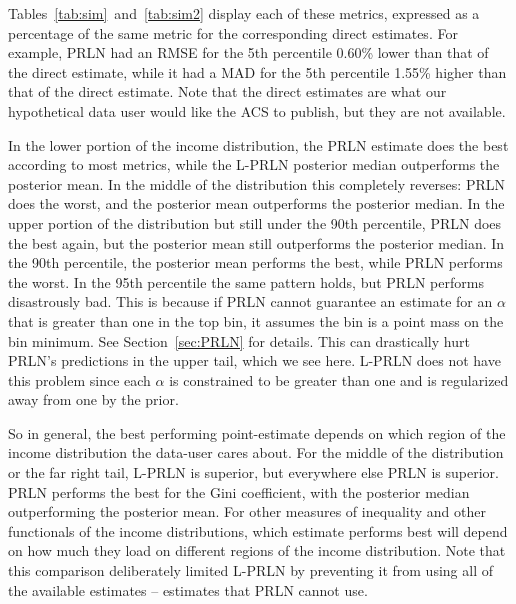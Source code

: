 \documentclass[12pt]{article}
\begin{document}
Tables~\ref{tab:sim}~and~\ref{tab:sim2} display each of these metrics, expressed as a percentage of the same metric for the corresponding direct estimates. For example, PRLN had an RMSE for the 5th percentile 0.60\% lower than that of the direct estimate, while it had a MAD for the 5th percentile 1.55\% higher than that of the direct estimate. Note that the direct estimates are what our hypothetical data user would like the ACS to publish, but they are not available.

In the lower portion of the income distribution, the PRLN estimate does the best according to most metrics, while the L-PRLN posterior median outperforms the posterior mean. In the middle of the distribution this completely reverses: PRLN does the worst, and the posterior mean outperforms the posterior median. In the upper portion of the distribution but still under the 90th percentile, PRLN does the best again, but the posterior mean still outperforms the posterior median. In the 90th percentile, the posterior mean performs the best, while PRLN performs the worst. In the 95th percentile the same pattern holds, but PRLN performs disastrously bad. This is because if PRLN cannot guarantee an estimate for an $\alpha$ that is greater than one in the top bin, it assumes the bin is a point mass on the bin minimum. See Section~\ref{sec:PRLN} for details. This can drastically hurt PRLN's predictions in the upper tail, which we see here. L-PRLN does not have this problem since each $\alpha$ is constrained to be greater than one and is regularized away from one by the prior.

So in general, the best performing point-estimate depends on which region of the income distribution the data-user cares about. For the middle of the distribution or the far right tail, L-PRLN is superior, but everywhere else PRLN is superior. PRLN performs the best for the Gini coefficient, with the posterior median outperforming the posterior mean. For other measures of inequality and other functionals of the income distributions, which estimate performs best will depend on how much they load on different regions of the income distribution. Note that this comparison deliberately limited L-PRLN by preventing it from using all of the available estimates -- estimates that PRLN cannot use.
\end{document}
